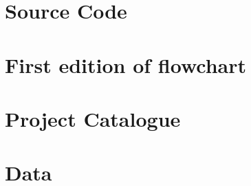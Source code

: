 \chapter{Source Code} \label{Appendix: SourceCode}



\chapter{First edition of flowchart} \label{Appendix:FirstFlowchart}

\chapter{Project Catalogue} \label{P1Katalog}



\chapter{Data} \label{Appendix:Data}


% 

